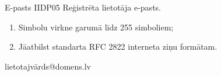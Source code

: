 {E-pasts}
{IIDP05}
{
	Reģistrēta lietotāja e-pasts.
}
{
	\begin{enumerate}
		\item Simbolu virkne garumā līdz 255 simboliem;
		\item Jāatbilst standarta RFC 2822 interneta ziņu formātam.
	\end{enumerate}
}
{
	lietotajvārds@domens.lv
}
